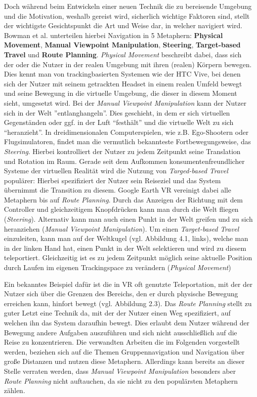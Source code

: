 Doch während beim Entwickeln einer neuen Technik die zu bereisende Umgebung und die Motivation, weshalb gereist wird, sicherlich wichtige Faktoren sind, stellt der wichtigste Gesichtspunkt die Art und Weise dar, in welcher navigiert wird. Bowman et al. \cite{Bowman2001AnDesign} unterteilen hierbei Navigation in 5 Metaphern: \textbf{Physical Movement}, \textbf{Manual Viewpoint Manipulation}, \textbf{Steering}, \textbf{Target-based Travel} und \textbf{Route Planning}. 
\textit{Physical Movement} beschreibt dabei, dass sich der oder die Nutzer in der realen Umgebung mit ihren (realen) Körpern bewegen. Dies kennt man von trackingbasierten Systemen wie der HTC Vive, bei denen sich der Nutzer mit seinem getrackten Headset in einem realen Umfeld bewegt und seine Bewegung in die virtuelle Umgebung, die dieser in diesem Moment sieht, umgesetzt wird.
Bei der \textit{Manual Viewpoint Manipulation} kann der Nutzer sich in der Welt ”entlanghangeln”. Dies geschieht, in dem er sich virtuellen Gegenständen oder ggf. in der Luft “festhält” und die virtuelle Welt zu sich “heranzieht”. 
In dreidimensionalen Computerspielen, wie z.B. Ego-Shootern oder Flugsimulatoren, findet man die vermutlich bekannteste Fortbewegungsweise, das \textit{Steering}. Hierbei kontrolliert der Nutzer zu jedem Zeitpunkt seine Translation und Rotation im Raum.
Gerade seit dem Aufkommen konsumentenfreundlicher Systeme der virtuellen Realität wird die Nutzung von \textit{Targed-based Travel} populärer: Hierbei spezifiziert der Nutzer sein Reiseziel und das System übernimmt die Transition zu diesem. 
Google Earth VR vereinigt dabei alle Metaphern bis auf \textit{Route Planning}. Durch das Anzeigen der Richtung mit dem Controller und gleichzeitigem Knopfdrücken kann man durch die Welt fliegen (\textit{Steering}). Alternativ kann man auch einen Punkt in der Welt greifen und zu sich heranziehen (\textit{Manual Viewpoint Manipulation}). Um einen \textit{Target-based Travel} einzuleiten, kann man auf der Weltkugel (vgl. Abbildung 4.1, links), welche man in der linken Hand hat, einen Punkt in der Welt selektieren und wird zu diesem teleportiert. Gleichzeitig ist es zu jedem Zeitpunkt möglich seine aktuelle Position durch Laufen im eigenen Trackingspace zu verändern (\textit{Physical Movement}) 

Ein bekanntes Beispiel dafür ist die in VR oft genutzte Teleportation, mit der der Nutzer sich über die Grenzen des Bereichs, den er durch physische Bewegung erreichen kann, hinfort bewegt (vgl. Abbildung 2.3).
Das \textit{Route Planning} stellt zu guter Letzt eine Technik da, mit der der Nutzer einen Weg spezifiziert, auf welchen ihn das System daraufhin bewegt. Dies erlaubt dem Nutzer während der Bewegung andere Aufgaben auszuführen und sich nicht ausschließlich auf die Reise zu konzentrieren. Die verwandten Arbeiten die im Folgenden vorgestellt werden, beziehen sich auf die Themen Gruppennavigation und Navigation über große Distanzen und nutzen diese Metaphern. Allerdings kann bereits an dieser Stelle verraten werden, dass \textit{Manual Viewpoint Manipulation} besonders aber \textit{Route Planning} nicht auftauchen, da sie nicht zu den populärsten Metaphern zählen.

